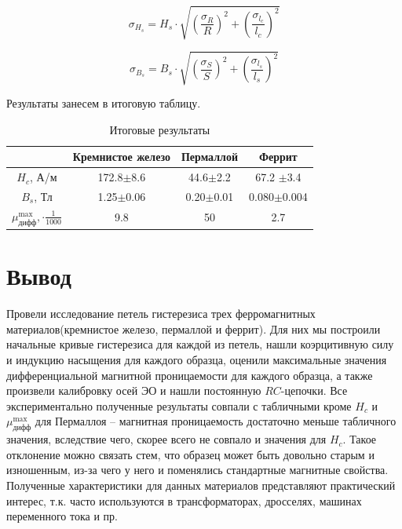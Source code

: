 \documentclass[a4paper, 14pt]{extarticle}
\begin{document}
\begin{equation}\label{}
\sigma_{H_s} = H_s\cdot\sqrt{(\frac{\sigma_R}{R})^2 + (\frac{\sigma_{l_c}}{l_c})^2}
\end{equation}


\begin{equation}\label{}
\sigma_{B_s} = B_s\cdot \sqrt{(\frac{\sigma_S}{S})^2 + (\frac{\sigma_{l_s}}{l_s})^2}
\end{equation}



Результаты занесем в итоговую таблицу. 

\begin{table}[h!]
	\centering
	\caption{Итоговые результаты}
    \begin{tabular}{|c|c|c|c|}
	\hline 
		& Кремнистое железо & Пермаллой & Феррит \\
		\hline 
		$H_c$, А/м & 172.8$\pm$8.6 & 44.6$\pm$2.2 & 67.2 $\pm$3.4\\
		\hline
		$B_s$, Тл &  1.25$\pm$0.06 & 0.20$\pm$0.01 & 0.080$\pm$0.004\\
		\hline
		$\mu_{\text{дифф}}^{\max}, \cdot \frac{1}{1000}$ & 9.8 & 50 & 2.7\\
        \hline
	    \end{tabular}%
	    
\label{resT}%
\end{table}%



\section{Вывод}
Провели исследование петель гистерезиса трех ферромагнитных материалов(кремнистое железо, пермаллой и феррит). Для них мы построили начальные кривые гистерезиса для каждой из петель, нашли коэрцитивную силу и индукцию насыщения для каждого образца, оценили максимальные значения дифференциальной магнитной проницаемости для каждого образца, а также произвели калибровку осей ЭО и нашли постоянную $RC$-цепочки. Все экспериментально полученные результаты совпали с табличными кроме $H_c$ и $\mu_{\text{дифф}}^{\max}$ для Пермаллоя -- магнитная проницаемость достаточно меньше  табличного значения, вследствие чего, скорее всего не совпало и значения для $H_c$. Такое отклонение можно связать стем, что образец может быть довольно старым и изношенным, из-за чего у него и поменялись стандартные магнитные свойства. Полученные характеристики для данных материалов представляют практический интерес, т.к. часто используются в трансформаторах, дросселях, машинах переменного тока и пр.
\end{document}
